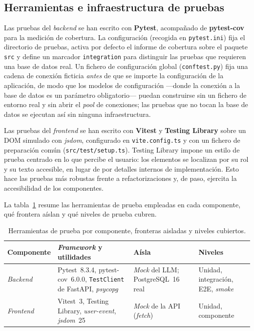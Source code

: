 \subsection{Herramientas e infraestructura de pruebas}
\label{sec:test-herramientas}

Las pruebas del \emph{backend} se han escrito con \textbf{Pytest}, acompañado de
\textbf{pytest-cov} para la medición de cobertura. La configuración (recogida en
\texttt{pytest.ini}) fija el directorio de pruebas, activa por defecto el informe
de cobertura sobre el paquete \texttt{src} y define un marcador
\texttt{integration} para distinguir las pruebas que requieren una base de datos
real. Un fichero de configuración global (\texttt{conftest.py}) fija una cadena
de conexión ficticia \emph{antes} de que se importe la configuración de la
aplicación, de modo que los modelos de configuración —donde la conexión a la base
de datos es un parámetro obligatorio— puedan construirse sin un fichero de
entorno real y sin abrir el \emph{pool} de conexiones; las pruebas que no tocan
la base de datos se ejecutan así sin ninguna infraestructura.

Las pruebas del \emph{frontend} se han escrito con \textbf{Vitest} y
\textbf{Testing Library} sobre un DOM simulado con \emph{jsdom}, configurado en
\texttt{vite.config.ts} y con un fichero de preparación común
(\texttt{src/test/setup.ts}). Testing Library impone un estilo de prueba centrado
en lo que percibe el usuario: los elementos se localizan por su rol y su texto
accesible, en lugar de por detalles internos de implementación. Esto hace las
pruebas más robustas frente a refactorizaciones y, de paso, ejercita la
accesibilidad de los componentes.

La tabla~\ref{tab:test-herramientas} resume las herramientas de prueba empleadas
en cada componente, qué frontera aíslan y qué niveles de prueba cubren.

\begin{table}[H]
\centering
\renewcommand{\arraystretch}{1.25}
\begin{tabular}{p{2.0cm}p{4.2cm}p{3.1cm}p{3.0cm}}
\hline
\textbf{Componente} & \textbf{\emph{Framework} y utilidades} & \textbf{Aísla} &
\textbf{Niveles} \\
\hline
\emph{Backend} &
Pytest~8.3.4, pytest-cov~6.0.0, \texttt{TestClient} de FastAPI, \emph{psycopg} &
\emph{Mock} del LLM; PostgreSQL~16 real &
Unidad, integración, E2E, \emph{smoke} \\
\hline
\emph{Frontend} &
Vitest~3, Testing Library, \emph{user-event}, \emph{jsdom}~25 &
\emph{Mock} de la API (\emph{fetch}) &
Unidad, componente \\
\hline
\end{tabular}
\caption{Herramientas de prueba por componente, fronteras aisladas y niveles
cubiertos.}
\label{tab:test-herramientas}
\end{table}

